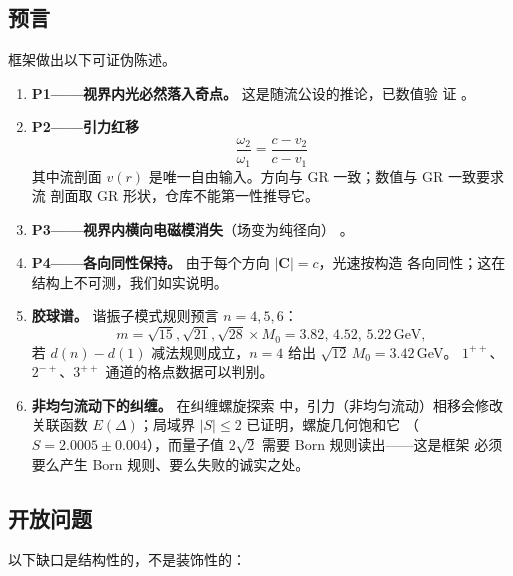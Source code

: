 \documentclass[aps,prd,preprint,superscriptaddress,amsmath,amssymb]{revtex4-2}
\begin{document}
\subsection{预言}\label{sec:predictions}

框架做出以下可证伪陈述。

\begin{enumerate}
  \item \textbf{P1——视界内光必然落入奇点。} 这是随流公设的推论，已数值验
  证 \cite{ProjectionPhysics-MF}。
  \item \textbf{P2——引力红移}
  \begin{equation}
  \frac{\omega_2}{\omega_1} = \frac{c-v_2}{c-v_1}
  \end{equation}
  其中流剖面 $v(r)$ 是唯一自由输入。方向与 GR 一致；数值与 GR 一致要求流
  剖面取 GR 形状，仓库不能第一性推导它。
  \item \textbf{P3——视界内横向电磁模消失}（场变为纯径向）
  \cite{ProjectionPhysics-MF}。
  \item \textbf{P4——各向同性保持。} 由于每个方向 $|\bm{C}|=c$，光速按构造
  各向同性；这在结构上不可测，我们如实说明。
  \item \textbf{胶球谱。} 谐振子模式规则预言 $n=4,5,6$：
  \begin{equation}
  m = \sqrt{15},\sqrt{21},\sqrt{28} \times M_0 = 3.82,\,4.52,\,5.22\,\mathrm{GeV},
  \end{equation}
  若 $d(n)-d(1)$ 减法规则成立，$n=4$ 给出 $\sqrt{12}\,M_0=3.42$\,GeV。
  $1^{++}$、$2^{-+}$、$3^{++}$ 通道的格点数据可以判别。
  \item \textbf{非均匀流动下的纠缠。} 在纠缠螺旋探索
  \cite{ProjectionPhysics-helix} 中，引力（非均匀流动）相移会修改关联函数
  $E(\Delta)$；局域界 $|S|\leq2$ 已证明，螺旋几何饱和它
  （$S=2.0005\pm0.004$），而量子值 $2\sqrt2$ 需要 Born 规则读出——这是框架
  必须要么产生 Born 规则、要么失败的诚实之处。
\end{enumerate}

\subsection{开放问题}

以下缺口是结构性的，不是装饰性的：
\end{document}
